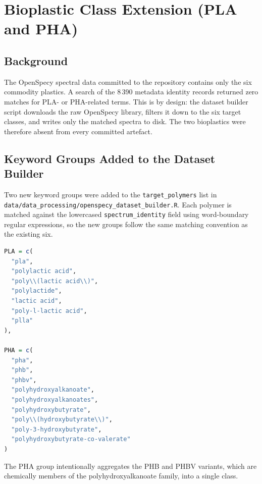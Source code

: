 \documentclass[11pt,a4paper]{article}
\begin{document}
\section{Bioplastic Class Extension (PLA and PHA)}

\subsection{Background}

The OpenSpecy spectral data committed to the repository contains only the six
commodity plastics. A search of the 8\,390 metadata identity records returned
zero matches for PLA- or PHA-related terms. This is by design: the dataset
builder script downloads the raw OpenSpecy library, filters it down to the six
target classes, and writes only the matched spectra to disk. The two bioplastics
were therefore absent from every committed artefact.

\subsection{Keyword Groups Added to the Dataset Builder}

Two new keyword groups were added to the \texttt{target\_polymers} list in
\texttt{data/data\_processing/openspecy\_dataset\_builder.R}. Each polymer is
matched against the lowercased \texttt{spectrum\_identity} field using
word-boundary regular expressions, so the new groups follow the same matching
convention as the existing six.

\begin{lstlisting}[language=R]
PLA = c(
  "pla",
  "polylactic acid",
  "poly\\(lactic acid\\)",
  "polylactide",
  "lactic acid",
  "poly-l-lactic acid",
  "plla"
),

PHA = c(
  "pha",
  "phb",
  "phbv",
  "polyhydroxyalkanoate",
  "polyhydroxyalkanoates",
  "polyhydroxybutyrate",
  "poly\\(hydroxybutyrate\\)",
  "poly-3-hydroxybutyrate",
  "polyhydroxybutyrate-co-valerate"
)
\end{lstlisting}

The PHA group intentionally aggregates the PHB and PHBV variants, which are
chemically members of the polyhydroxyalkanoate family, into a single class.
\end{document}
